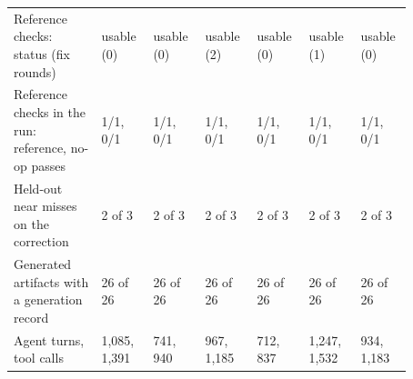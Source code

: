 \begin{table}[t]
\begin{tabular}{p{0.2\linewidth}p{0.112\linewidth}p{0.112\linewidth}p{0.112\linewidth}p{0.112\linewidth}p{0.112\linewidth}p{0.112\linewidth}}
\raggedright\hspace{0pt}Reference checks: status (fix rounds) & \raggedright\hspace{0pt}usable (0) & \raggedright\hspace{0pt}usable (0) & \raggedright\hspace{0pt}usable (2) & \raggedright\hspace{0pt}usable (0) & \raggedright\hspace{0pt}usable (1) & \raggedright\hspace{0pt}usable (0) \tabularnewline
\raggedright\hspace{0pt}Reference checks in the run: reference, no-op passes & \raggedright\hspace{0pt}1/1, 0/1 & \raggedright\hspace{0pt}1/1, 0/1 & \raggedright\hspace{0pt}1/1, 0/1 & \raggedright\hspace{0pt}1/1, 0/1 & \raggedright\hspace{0pt}1/1, 0/1 & \raggedright\hspace{0pt}1/1, 0/1 \tabularnewline
\raggedright\hspace{0pt}Held-out near misses on the correction & \raggedright\hspace{0pt}2 of 3 & \raggedright\hspace{0pt}2 of 3 & \raggedright\hspace{0pt}2 of 3 & \raggedright\hspace{0pt}2 of 3 & \raggedright\hspace{0pt}2 of 3 & \raggedright\hspace{0pt}2 of 3 \tabularnewline\midrule
\raggedright\hspace{0pt}Generated artifacts with a generation record & \raggedright\hspace{0pt}26 of 26 & \raggedright\hspace{0pt}26 of 26 & \raggedright\hspace{0pt}26 of 26 & \raggedright\hspace{0pt}26 of 26 & \raggedright\hspace{0pt}26 of 26 & \raggedright\hspace{0pt}26 of 26 \tabularnewline
\raggedright\hspace{0pt}Agent turns, tool calls & \raggedright\hspace{0pt}1{,}085, 1{,}391 & \raggedright\hspace{0pt}741, 940 & \raggedright\hspace{0pt}967, 1{,}185 & \raggedright\hspace{0pt}712, 837 & \raggedright\hspace{0pt}1{,}247, 1{,}532 & \raggedright\hspace{0pt}934, 1{,}183 \tabularnewline

\end{tabular}
\end{table}
